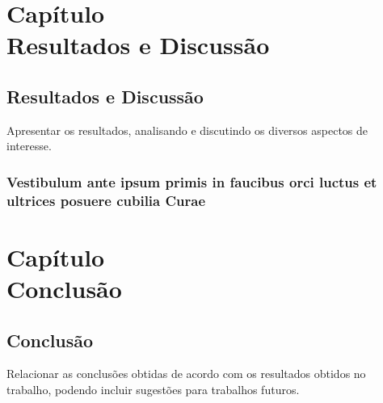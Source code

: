 \documentclass[
	12pt,			%
	openany,			%
	oneside,			%
	a4paper,			%
	english,			%
	french,				%
	spanish,			%
	brazil				%
	]{abntex2}
\begin{document}
\part*{Capítulo \thechapter \\ Resultados e Discussão }
\addtocounter{chapter}{-1}

\chapter{Resultados e Discussão}
Apresentar os resultados, analisando e discutindo os diversos aspectos de interesse.
\section{Vestibulum ante ipsum primis in faucibus orci luctus et ultrices
posuere cubilia Curae}

\lipsum[21]


\part*{Capítulo \thechapter \\ Conclusão}
\addtocounter{chapter}{-1}
\chapter{Conclusão}
Relacionar as conclusões obtidas de acordo com os resultados obtidos no trabalho,
podendo incluir sugestões para trabalhos futuros.

\postextual
\end{document}
